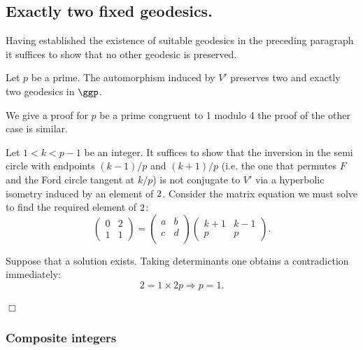 \subsection{Exactly two fixed geodesics.}

Having established the existence of suitable geodesics in the preceding paragraph
it suffices to show that no other geodesic is preserved.


\begin{lem} \label{the end}
Let $p$ be a prime.
The automorphism induced by $V'$ preserves two and exactly two geodesics in $\ggp$.
\end{lem}


\proof 
We give a proof for  $p$ be a prime congruent to 1 modulo 4
the proof of the other case is similar.

Let $1< k < p-1$  be an integer. 
It suffices to show that the inversion in the semi circle with endpoints  
 $(k-1)/p$ and  $(k+1)/p$
(i.e. the one that permutes $F$ and the Ford circle tangent at $k/p$)
is not conjugate to $V'$ 
via a hyperbolic isometry induced by an element of $\sl2$.
Consider the  matrix equation we must solve 
to find the required element of $\sl2$:
\begin{equation}
\begin{pmatrix}
0& 2\\
1 & 1
\end{pmatrix}
= 
\begin{pmatrix}
a & b \\
c & d\\
\end{pmatrix}
\begin{pmatrix}
k + 1 & k-1 \\
p  & p
\end{pmatrix}.
\end{equation}

Suppose that a solution exists. Taking determinants one obtains a contradiction immediately:
$$ 2 = 1 \times 2p \Rightarrow p = 1.$$

\hfill $\Box$


\subsubsection{Composite integers}

